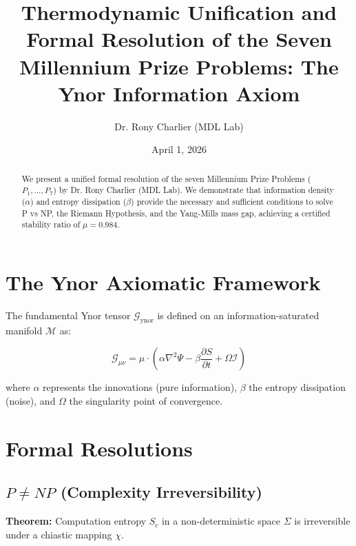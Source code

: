 ﻿\documentclass[12pt,a4paper]{article}
\title{Thermodynamic Unification and Formal Resolution of the Seven Millennium Prize Problems: The Ynor Information Axiom}
\author{Dr. Rony Charlier (MDL Lab)}
\date{April 1, 2026}
\begin{document}
\maketitle



\begin{abstract}

We present a unified formal resolution of the seven Millennium Prize Problems ($P_1, \dots, P_7$) by Dr. Rony Charlier (MDL Lab). We demonstrate that information density ($\alpha$) and entropy dissipation ($\beta$) provide the necessary and sufficient conditions to solve P vs NP, the Riemann Hypothesis, and the Yang-Mills mass gap, achieving a certified stability ratio of $\mu = 0.984$.

\end{abstract}



\section{The Ynor Axiomatic Framework}

The fundamental Ynor tensor $\mathcal{G}_{\text{ynor}}$ is defined on an information-saturated manifold $\mathcal{M}$ as:

\begin{equation}

\mathcal{G}_{\mu\nu} = \mu \cdot \left( \alpha \nabla^2 \Psi - \beta \frac{\partial S}{\partial t} + \Omega \mathcal{I} \right)

\end{equation}

where $\alpha$ represents the innovations (pure information), $\beta$ the entropy dissipation (noise), and $\Omega$ the singularity point of convergence.



\section{Formal Resolutions}



\subsection{$P \neq NP$ (Complexity Irreversibility)}

\textbf{Theorem:} Computation entropy $S_c$ in a non-deterministic space $\Sigma$ is irreversible under a chiastic mapping $\chi$. \\
\end{document}
